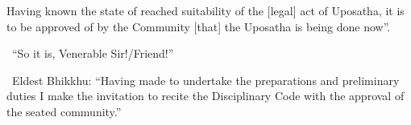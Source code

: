 Having known the state of reached suitability of the [legal] act of Uposatha, it is to be approved of by the Community [that] the Uposatha is being done now''.

\begin{center}
	\anglebracketleft\ \hspace{-0.5mm}``So it is, Venerable Sir!/Friend!'' \hspace{-0.5mm}\anglebracketright\
\end{center}

\begin{center}
	\anglebracketleft\ \hspace{-0.5mm}Eldest Bhikkhu: ``Having made to undertake the preparations and preliminary duties I make the invitation to recite the Disciplinary Code with the approval of the seated community.'' \hspace{-0.5mm}\anglebracketright\
\end{center}

\clearpage

